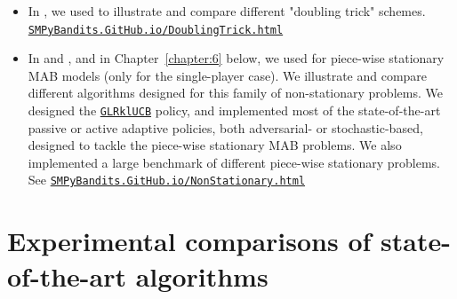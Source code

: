 \begin{itemize}
    \item
In \cite{Besson2018DoublingTricks}, we used \SMPyBandits{} to illustrate and compare different "doubling trick" schemes.
\texttt{\href{https://SMPyBandits.GitHub.io/DoublingTrick.html}{SMPyBandits.GitHub.io/DoublingTrick.html}}

    \item
In \cite{Besson2019GLRT} and \cite{Besson2019Gretsi}, and in Chapter~\ref{chapter:6} below, we used \SMPyBandits{} for piece-wise stationary MAB models (only for the single-player case). We illustrate and compare different algorithms designed for this family of non-stationary problems.
We designed the \texttt{\href{https://SMPyBandits.GitHub.io/docs/Policies.GLR_UCB.html}{GLRklUCB}} policy, and implemented most of the state-of-the-art passive or active adaptive policies, both adversarial- or stochastic-based, designed to tackle the piece-wise stationary MAB problems.
We also implemented a large benchmark of different piece-wise stationary problems.
See \texttt{\href{https://SMPyBandits.GitHub.io/NonStationary.html}{SMPyBandits.GitHub.io/NonStationary.html}}
\end{itemize}


\section{Experimental comparisons of state-of-the-art algorithms}
\label{sec:3:reviewSPAlgorithms}

